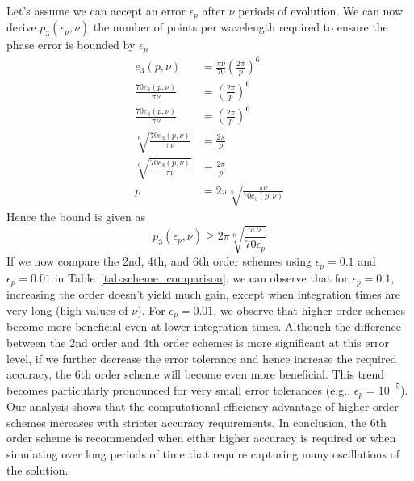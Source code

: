 Let's assume we can accept an error $\epsilon_p$ after $\nu$ periods of evolution. 
We can now derive $p_3(\epsilon_p, \nu)$ the number of points per wavelength required to ensure the phase error is bounded by $\epsilon_p$
\begin{equation}
	\begin{aligned}
		e_3(p, \nu)                               & = \frac{\pi \nu}{70} \left ( \frac{2\pi}{p} \right)^6 \\
		\frac{70 e_3(p, \nu)}{\pi \nu}            & =\left ( \frac{2\pi}{p} \right)^6                     \\
		\frac{70 e_3(p, \nu)}{\pi \nu}            & =\left ( \frac{2\pi}{p} \right)^6                     \\
		\sqrt[6]{\frac{70 e_3(p, \nu)}{\pi \nu} } & =  \frac{2\pi}{p}                                     \\
		\sqrt[6]{\frac{70 e_3(p, \nu)}{\pi \nu}}  & = \frac{2\pi}{p}                                      \\
		p                                         & = 2 \pi \sqrt[6]{\frac{\pi \nu}{70e_3(p, \nu)} }
	\end{aligned}
	\label{eq:bound}
\end{equation}
Hence the bound is given as
\begin{equation}
	p_3(\epsilon_p, \nu) \geq 2 \pi \sqrt[6]{\frac{\pi \nu}{70\epsilon_p} }
	\label{eq:bound_final}
\end{equation}
If we now compare the 2nd, 4th, and 6th order schemes using $\epsilon_p = 0.1$ and $\epsilon_p = 0.01$ in Table~\ref{tab:scheme_comparison}, we can observe that for $\epsilon_p = 0.1$, increasing the order doesn't yield much gain, except when integration times are very long (high values of $\nu$). For $\epsilon_p = 0.01$, we observe that higher order schemes become more beneficial even at lower integration times. 
Although the difference between the 2nd order and 4th order schemes is more significant at this error level, if we further decrease the error tolerance and hence increase the required accuracy, the 6th order scheme will become even more beneficial. This trend becomes particularly pronounced for very small error tolerances (e.g., $\epsilon_p = 10^{-5}$).
Our analysis shows that the computational efficiency advantage of higher order schemes increases with stricter accuracy requirements.
In conclusion, the 6th order scheme is recommended when either higher accuracy is required or when simulating over long periods of time that require capturing many oscillations of the solution.

